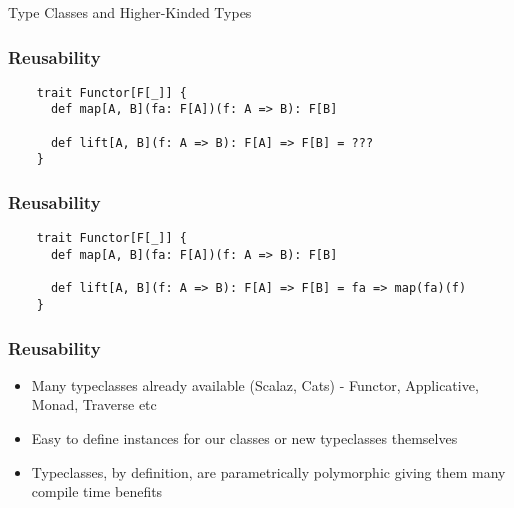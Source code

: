 \begin{section}{Type Classes and Higher-Kinded Types}
\begin{frame}[fragile]
  \frametitle{Reusability}
  \begin{verbatim}
    trait Functor[F[_]] {
      def map[A, B](fa: F[A])(f: A => B): F[B]

      def lift[A, B](f: A => B): F[A] => F[B] = ???
    }
  \end{verbatim}
\end{frame}

\begin{frame}[fragile]
  \frametitle{Reusability}
  \begin{verbatim}
    trait Functor[F[_]] {
      def map[A, B](fa: F[A])(f: A => B): F[B]

      def lift[A, B](f: A => B): F[A] => F[B] = fa => map(fa)(f)
    }
  \end{verbatim}
\end{frame}
\end{section}

\begin{frame}[fragile]
  \frametitle{Reusability}
  \begin{itemize}
  \item Many typeclasses already available (Scalaz, Cats) - Functor, Applicative, Monad, Traverse etc
  \item Easy to define instances for our classes or new typeclasses themselves
  \item Typeclasses, by definition, are parametrically polymorphic giving them many compile time benefits
  \end{itemize}
\end{frame}
